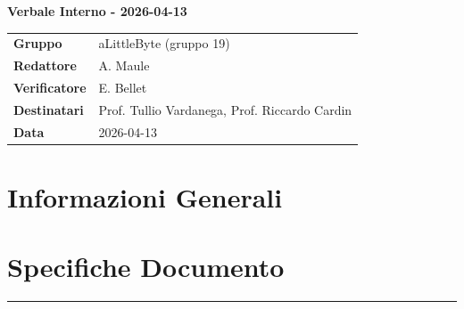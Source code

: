 \documentclass[a4paper,12pt]{article}
\begin{document}
\thispagestyle{firstpage}

\vspace*{0.5cm}

\begin{center}
    {\LARGE \textbf{Verbale Interno - 2026-04-13}}
\end{center}

\vspace{1.5cm}

\begin{center}
    \renewcommand{\arraystretch}{1.3}
    \begin{tcolorbox}[
        width=0.92\textwidth,
        colback=gray!6,
        colframe=gray!45,
        boxrule=0.5pt,
        arc=2mm,
        boxsep=0pt,
        left=8pt, right=8pt, top=8pt, bottom=8pt
    ]
        \begin{tabularx}{\linewidth}{>{\bfseries}p{3.5cm} X}
            Gruppo      & aLittleByte (gruppo 19) \\
            Redattore   & A. Maule \\
            Verificatore & E. Bellet\\
            Destinatari & Prof. Tullio Vardanega, Prof. Riccardo Cardin \\
            Data        & 2026-04-13\\
        \end{tabularx}
    \end{tcolorbox}
\end{center}

\newpage

\tableofcontents
\newpage
\section{Informazioni Generali}
\section*{Specifiche Documento}
\hrule
\vspace{1cm}
\end{document}
